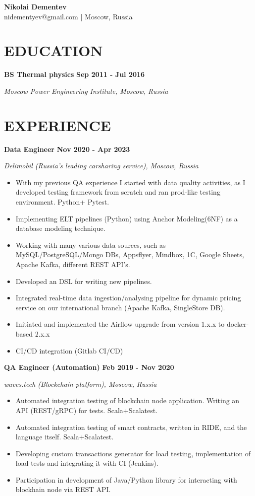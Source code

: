\documentclass[11pt,a4paper]{article}
\newcommand{\timeperiod}[1]{%
    \hfill{\small\textbf{#1}}\par%
}
\begin{document}
\begin{center}
\huge\textbf{Nikolai Dementev}\\[4pt]
\normalsize nidementyev@gmail.com | Moscow, Russia
\end{center}

\section{EDUCATION}
\textbf{BS Thermal physics}\timeperiod{Sep 2011 - Jul 2016}
\textit{Moscow Power Engineering Institute, Moscow, Russia}

\section{EXPERIENCE}
\textbf{Data Engineer}\timeperiod{Nov 2020 - Apr 2023}
\textit{Delimobil (Russia's leading carsharing service), Moscow, Russia}
\begin{itemize}
    \item With my previous QA experience I started with data quality activities, as I developed testing framework from scratch and ran prod-like testing environment. Python+ Pytest.
    \item Implementing ELT pipelines (Python) using Anchor Modeling(6NF) as a database modeling technique.
    \item Working with many various data sources, such as MySQL/PostgreSQL/Mongo DBs, Appsflyer, Mindbox, 1C, Google Sheets, Apache Kafka, different REST API's.
    \item Developed an DSL for writing new pipelines.
    \item Integrated real-time data ingestion/analysing pipeline for dynamic pricing service on our international branch (Apache Kafka, SingleStore DB).
    \item Initiated and implemented the Airflow upgrade from version 1.x.x to docker-based 2.x.x
    \item CI/CD integration (Gitlab CI/CD)
\end{itemize}

\textbf{QA Engineer (Automation)}\timeperiod{Feb 2019 - Nov 2020}
\textit{waves.tech (Blockchain platform), Moscow, Russia}
\begin{itemize}
    \item Automated integration testing of blockchain node application. Writing an API (REST/gRPC) for tests. Scala+Scalatest.
    \item Automated integration testing of smart contracts, written in RIDE, and the language itself. Scala+Scalatest.
    \item Developing custom transactions generator for load testing, implementation of load tests and integrating it with CI (Jenkins).
    \item Participation in development of Java/Python library for interacting with blockhain node via REST API.
\end{itemize}
\end{document}
